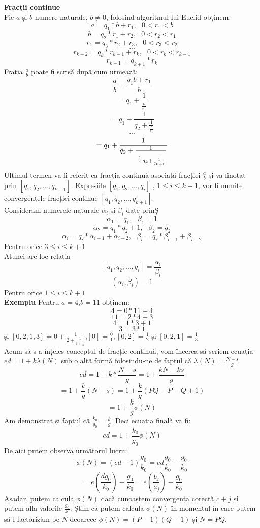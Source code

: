 \documentclass[12]{article}
\begin{document}
\textbf{Fracții continue} \\
Fie $a$ și $b$ numere naturale, $b \neq 0$, folosind algoritmul lui Euclid obținem:
$$a= q_1 *b+r_1, \ \ \ 0<r_1<b$$
$$b=q_2*r_1+r_2, \ \ \ 0<r_2<r_1$$
$$r_1= q_3*r_2+r_3, \ \ \ 0<r_3<r_2$$
$$ ...$$
$$ r_{k-2} = q_k *r_{k-1} +r_k , \ \ \ 0<r_k<r_{k-1}$$
$$ r_{k-1} = q_{k+1} * r_k$$
Frația $\frac{a}{b} $ poate fi scrisă după cum urmează:
$$ \frac{a}{b} = \frac{q_1b+r_1}{b} $$
$$ = q_1 + \frac{1}{\frac{b}{r_1}}$$
$$ = q_1 + \frac{1}{q_2 + \frac{1}{ \frac{b}{r_1}}} $$
$$ ...$$
$$ = q_1 + \frac{1}{q_2 + \frac{1}{\vdotswithin{q_k} q_k + \frac{1}{q_{k+1}}}} $$
Ultimul termen va fi referit ca fracția continuă asociată fracției $\frac{a}{b}$ și va finotat prin $[ q_1,q_2,...,q_{k+1}]$. Expresiile $[q_1,q_2,...,q_i]$ , $1 \leqslant i \leqslant k+1$, vor fi numite convergențele fracției continue $[q_1,q_2,...,q_{k+1}]$.\\
Considerăm numerele naturale $\alpha_{i}$ și $\beta_{i}$ date prinȘ
$$ \alpha_1 =q_1, \ \ \ \beta_1=1$$
$$ \alpha_2 = q_1 * q_2 + 1, \ \ \ \beta_2=q_2$$
$$ \alpha_i = q_i * \alpha_{i-1} + \alpha_{i-2}, \ \ \ \beta_i = q_i * \beta_{i-1} + \beta_{i-2}$$
Pentru orice $3 \leqslant i \leqslant k+1$ \\
Atunci are loc relația 
$$[q_1,q_2,...,q_i] = \frac{\alpha_i}{\beta_i}$$
$$(\alpha_i,\beta_i)=1$$
Pentru orice $1 \leqslant i \leqslant k+1$ \\
\textbf{Exemplu} Pentru $a=4$,$b=11$ obținem:\\
$$4=0*11+4$$
$$11=2*4+3$$
$$4=1*3+1$$
$$3=3*1$$
și $[0,2,1,3]= 0 + \frac{1}{2+\frac{1}{1+\frac{1}{3}}}$,$[0]=\frac{0}{1},[0,2]=\frac{1}{2}$ și $[0,2,1]=\frac{1}{3}$  \\
Acum să s-a înțeles conceptul de fracție continuă, vom încerca să scriem  ecuația $ed=1+k\lambda(N)$ sub o altă formă folosindu-ne de faptul că $\lambda(N)= \frac{N-s}{g}$
$$ ed = 1+k * \frac{N-s}{g} = 1 + \frac{kN-ks}{g}$$
$$ = 1+ \frac{k}{g}(N-s) = 1 + \frac{k}{g} (PQ - P - Q +1)$$
$$ = 1+\frac{k}{g}\phi(N)$$
Am demonstrat și faptul că $\frac{k_0}{g_0} = \frac{k}{g}$. Deci ecuația finală va fi:
$$ ed=1+\frac{k_0}{g_0}\phi(N)$$
De aici putem observa următorul lucru:
$$\phi(N) = (ed - 1 )\frac{g_0}{k_0}=ed \frac{g_0}{k_0} - \frac{g_0}{k_0}$$
$$ = e \left(  \frac{dg_0}{k_0}  \right) - \frac{g_0}{k_0} = e \left( \frac{b_j}{a_j}  \right) - \frac{g_0}{k_0}$$
Așadar, putem calcula $\phi(N)$ dacă cunoaștem convergența corectă $c+j$ și putem afla valorile $\frac{g_0}{k_0}$. Știm că putem calcula $\phi(N)$ în momentul în care putem să-l factorizăm pe $N$ deoarece $\phi(N)=(P-1)(Q-1)$ și $N=PQ$. \\
\end{document}
